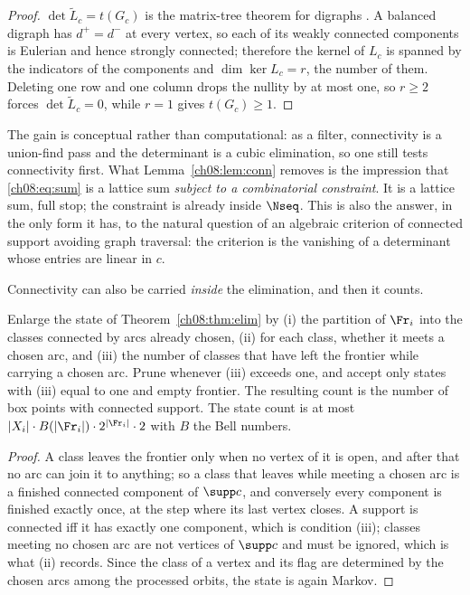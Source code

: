 \begin{proof}
$\det\widetilde L_c=t(G_c)$ is the matrix-tree theorem for digraphs \cite{Tutte48}. A balanced
digraph has $d^+=d^-$ at every vertex, so each of its weakly connected components is Eulerian
and hence strongly connected; therefore the kernel of $L_c$ is spanned by the indicators of
the components and $\dim\ker L_c=r$, the number of them. Deleting one row and one column drops
the nullity by at most one, so $r\ge2$ forces $\det\widetilde L_c=0$, while $r=1$ gives
$t(G_c)\ge1$.
\end{proof}

\begin{remark}\label{ch08:rem:predicate}
The gain is conceptual rather than computational: as a filter, connectivity is a union-find
pass and the determinant is a cubic elimination, so one still tests connectivity first. What
Lemma~\ref{ch08:lem:conn} removes is the impression that \eqref{ch08:eq:sum} is a lattice sum
\emph{subject to a combinatorial constraint}. It is a lattice sum, full stop; the constraint
is already inside $\Nseq$. This is also the answer, in the only form it has, to the natural question of an
algebraic criterion of connected support avoiding graph traversal: the
criterion is the vanishing of a determinant whose entries are linear in $c$.
\end{remark}

Connectivity can also be carried \emph{inside} the elimination, and then it counts.

\begin{theorem}\label{ch08:thm:connected}
Enlarge the state of Theorem~\ref{ch08:thm:elim} by (i) the partition of $\Fr_i$ into the classes
connected by arcs already chosen, (ii) for each class, whether it meets a chosen arc, and
(iii) the number of classes that have left the frontier while carrying a chosen arc. Prune
whenever (iii) exceeds one, and accept only states with (iii) equal to one and empty frontier.
The resulting count is the number of box points with connected support. The state count is at
most $|X_i|\cdot B(|\Fr_i|)\cdot2^{|\Fr_i|}\cdot2$ with $B$ the Bell numbers.
\end{theorem}

\begin{proof}
A class leaves the frontier only when no vertex of it is open, and after that no arc can join
it to anything; so a class that leaves while meeting a chosen arc is a finished connected
component of $\supp c$, and conversely every component is finished exactly once, at the step
where its last vertex closes. A support is connected iff it has exactly one component, which
is condition (iii); classes meeting no chosen arc are not vertices of $\supp c$ and must be
ignored, which is what (ii) records. Since the class of a vertex and its flag are determined
by the chosen arcs among the processed orbits, the state is again Markov.
\end{proof}


